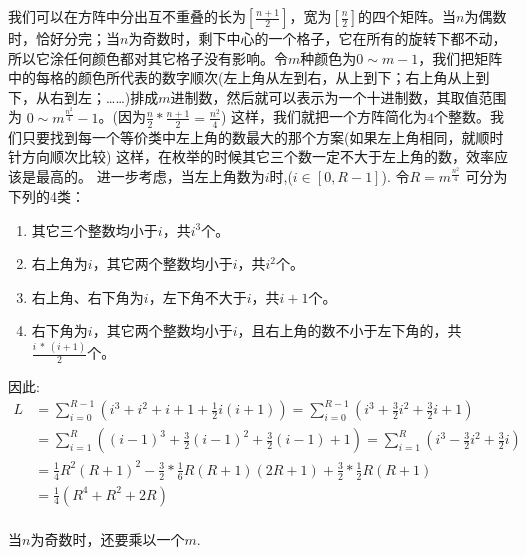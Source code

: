 我们可以在方阵中分出互不重叠的长为$[\frac{n+1}{2}]$，宽为$[\frac{n}{2}]$的四个矩阵。当$n$为偶数时，恰好分完；当$n$为奇数时，剩下中心的一个格子，它在所有的旋转下都不动，所以它涂任何颜色都对其它格子没有影响。令$m$种颜色为$0\sim m-1$，我们把矩阵中的每格的颜色所代表的数字顺次(左上角从左到右，从上到下；右上角从上到下，从右到左；……)排成$m$进制数，然后就可以表示为一个十进制数，其取值范围为 $0 \sim m^{\frac{n^2}{4}}-1$。(因为$\frac{n}{2}*\frac{n+1}{2}=\frac{n^2}{4}$) 这样，我们就把一个方阵简化为$4$个整数。我们只要找到每一个等价类中左上角的数最大的那个方案(如果左上角相同，就顺时针方向顺次比较) 这样，在枚举的时候其它三个数一定不大于左上角的数，效率应该是最高的。  进一步考虑，当左上角数为$i$时,($i \in [0, R-1]$). 令$R=m^{\frac{n^2}{4}}$ 可分为下列的4类：
\begin{enumerate}
\item  其它三个整数均小于$i$，共$i^3$个。
\item 右上角为$i$，其它两个整数均小于$i$，共$i^2$个。
\item  右上角、右下角为$i$，左下角不大于$i$，共$i+1$个。
\item  右下角为$i$，其它两个整数均小于$i$，且右上角的数不小于左下角的，共$\frac{i\ *\ (i+1)}{2}$个。
\end{enumerate}

因此:
\[
\begin{aligned}
L&=\sum_{i=0}^{R-1}(i^3+i^2+i+1+\frac{1}{2}i(i+1))=\sum_{i=0}^{R-1}(i^3+\frac{3}{2}i^2+\frac{3}{2}i+1) \\
&=\sum_{i=1}^{R}((i-1)^3+\frac{3}{2}(i-1)^2+\frac{3}{2}(i-1)+1)=\sum_{i=1}^{R}(i^3-\frac{3}{2}i^2+\frac{3}{2}i) \\
&=\frac{1}{4}R^2(R+1)^2-\frac{3}{2}*\frac{1}{6}R(R+1)(2R+1)+\frac{3}{2}*\frac{1}{2}R(R+1) \\
&=\frac{1}{4}(R^4+R^2+2R) \\
\end{aligned}
\]

当$n$为奇数时，还要乘以一个$m$. \\

